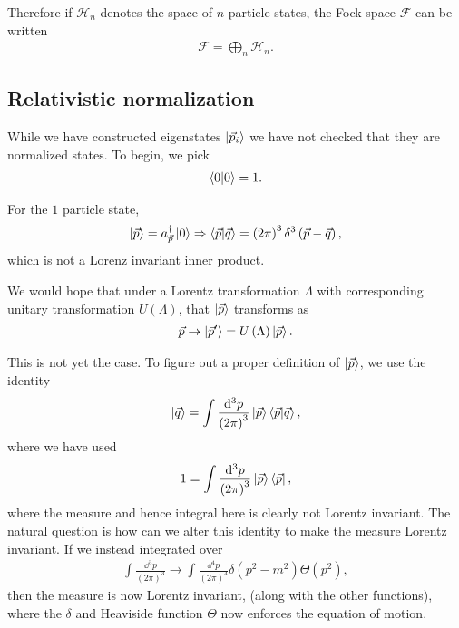 Therefore if $\mathscr{H}_n$ denotes the space of $n$ particle states, the Fock space $\mathscr{F}$ can be written
\begin{align}
    \mathscr{F} = \bigoplus_{n} \mathscr{H}_n
.\end{align}

\subsection{Relativistic normalization}

While we have constructed eigenstates $\ket{\vec{p}_i}$ we have not checked that they are normalized states. To begin, we pick
\begin{align}
    \bra{0} \ket{0} = 1
.\end{align}

For the $1$ particle state,
\begin{align}
    \ket{\vec{p}} = a^{\dag}_{\vec{p}} \ket{0} \Rightarrow \bra{\vec{p}} \ket{\vec{q}} = \left( 2\pi \right)^3 \delta^{3} \left( \vec{p} - \vec{q} \right) 
,\end{align}
which is not a Lorenz invariant inner product.

We would hope that under a Lorentz transformation $\Lambda$ with corresponding unitary transformation $U \left( \Lambda \right) $, that $\ket{\vec{p}}$ transforms as
\begin{align}
    \vec{p} \to \ket{\vec{p}'} = U \left( \Lambda \right) \ket{\vec{p}}
.\end{align}

This is not yet the case. To figure out a proper definition of $\ket{\vec{p}}$, we use the identity
\begin{align}
    \ket{\vec{q}} = \int \frac{\dd{^3p}}{\left( 2\pi \right)^3} \ket{\vec{p}} \bra{\vec{p}} \ket{\vec{q}}
,\end{align}
where we have used
\begin{align}
    1 = \int \frac{\dd{^3p}}{\left( 2\pi \right)^3} \ket{\vec{p}} \bra{\vec{p}}
,\end{align}
where the measure and hence integral here is clearly not Lorentz invariant. The natural question is how can we alter this identity to make the measure Lorentz invariant. If we instead integrated over
\begin{align}
    \int \frac{\dd{^3p}}{\left( 2\pi \right)^3} \to \int \frac{\dd{^{4}p}}{\left( 2\pi \right)^{4}} \delta \left( p^2 - m^2 \right)  \Theta \left( p^2 \right) 
,\end{align}
then the measure is now Lorentz invariant, (along with the other functions), where the $\delta $ and Heaviside function $\Theta$ now enforces the equation of motion.

